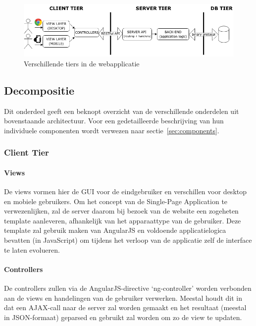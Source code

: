 \documentclass{article}
\begin{document}
\begin{figure}[!h]
\centering
 \includegraphics[width=140mm]{Architecture.png}
 \caption{Verschillende tiers in de webapplicatie}
 \label{Architecture}
\end{figure}

\subsection{Decompositie}

Dit onderdeel geeft een beknopt overzicht van de verschillende onderdelen uit bovenstaande architectuur. Voor een gedetailleerde beschrijving van hun individuele componenten wordt verwezen naar sectie~\ref{sec:components}.

\subsubsection{Client Tier}

\paragraph{Views} 
De views vormen hier de GUI voor de eindgebruiker en verschillen voor desktop en mobiele gebruikers. Om het concept van de Single-Page Application te verwezenlijken, zal de server daarom bij bezoek van de website een zogeheten template aanleveren, afhankelijk van het apparaattype van de gebruiker.
Deze template zal gebruik maken van AngularJS en voldoende applicatielogica bevatten (in JavaScript) om tijdens het verloop van de applicatie zelf de interface te laten evolueren.

\paragraph{Controllers} 
De controllers zullen via de AngularJS-directive `ng-controller' worden verbonden aan de views en handelingen van de gebruiker verwerken. Meestal houdt dit in dat een AJAX-call naar de server zal worden gemaakt en het resultaat (meestal in JSON-formaat) geparsed en gebruikt zal worden om zo de view te updaten.
\end{document}

